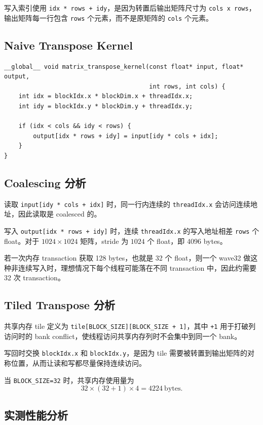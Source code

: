 \documentclass[UTF8,a4paper,12pt,fontset=none]{ctexart}
\begin{document}
写入索引使用 \texttt{idx * rows + idy}，是因为转置后输出矩阵尺寸为 \texttt{cols x rows}，输出矩阵每一行包含 \texttt{rows} 个元素，而不是原矩阵的 \texttt{cols} 个元素。

\subsection{Naive Transpose Kernel}

\begin{lstlisting}
__global__ void matrix_transpose_kernel(const float* input, float* output,
                                        int rows, int cols) {
    int idx = blockIdx.x * blockDim.x + threadIdx.x;
    int idy = blockIdx.y * blockDim.y + threadIdx.y;

    if (idx < cols && idy < rows) {
        output[idx * rows + idy] = input[idy * cols + idx];
    }
}
\end{lstlisting}

\subsection{Coalescing 分析}

读取 \texttt{input[idy * cols + idx]} 时，同一行内连续的 \texttt{threadIdx.x} 会访问连续地址，因此读取是 coalesced 的。

写入 \texttt{output[idx * rows + idy]} 时，连续 \texttt{threadIdx.x} 的写入地址相差 \texttt{rows} 个 float。对于 $1024\times1024$ 矩阵，stride 为 $1024$ 个 float，即 $4096$ bytes。

若一次内存 transaction 获取 128 bytes，也就是 32 个 float，则一个 wave32 做这种非连续写入时，理想情况下每个线程可能落在不同 transaction 中，因此约需要 32 次 transaction。

\subsection{Tiled Transpose 分析}

共享内存 tile 定义为 \texttt{tile[BLOCK\_SIZE][BLOCK\_SIZE + 1]}，其中 \texttt{+1} 用于打破列访问时的 bank conflict，使线程访问共享内存列时不会集中到同一个 bank。

写回时交换 \texttt{blockIdx.x} 和 \texttt{blockIdx.y}，是因为 tile 需要被转置到输出矩阵的对称位置，从而让读和写都尽量保持连续访问。

当 \texttt{BLOCK\_SIZE=32} 时，共享内存使用量为
\[
  32\times(32+1)\times4=4224\ \text{bytes}.
\]

\subsection{实测性能分析}
\end{document}
